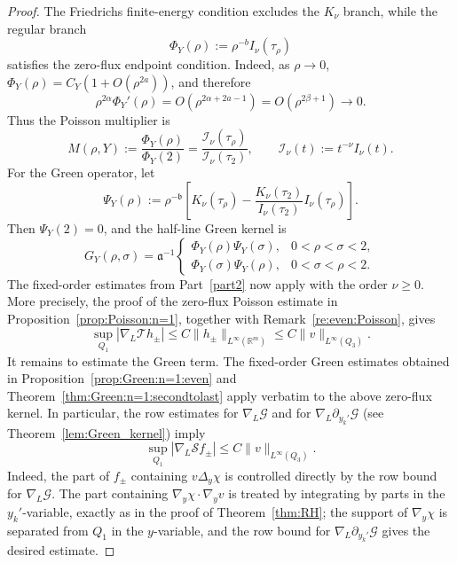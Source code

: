 \documentclass[12pt]{amsart}
\begin{document}
\begin{proof}
The Friedrichs finite-energy condition excludes the $K_\nu$ branch, while the regular branch
\begin{equation*}
    \Phi_Y(\rho):=\rho^{-b}I_\nu(\tau_\rho)
\end{equation*}
satisfies the zero-flux endpoint condition. Indeed, as $\rho\to 0$, $\Phi_Y(\rho)=C_Y\left(1+O(\rho^{2a})\right)$, and therefore
\begin{equation*}
\rho^{2\alpha}\Phi_Y'(\rho) = O\left(\rho^{2\alpha+2a-1}\right) = O\left(\rho^{2\beta+1}\right) \to 0.
\end{equation*}
Thus the Poisson multiplier is
\begin{equation*}
M(\rho,Y) := \frac{\Phi_Y(\rho)}{\Phi_Y(2)} = \frac{\mathcal I_\nu(\tau_\rho)}{\mathcal I_\nu(\tau_2)}, \qquad \mathcal I_\nu(t) := t^{-\nu} I_\nu(t).
\end{equation*}
For the Green operator, let
\begin{equation*}
\Psi_Y(\rho) := \rho^{-\mathfrak b} \left[ K_\nu(\tau_\rho) - \frac{K_\nu(\tau_2)} {I_\nu(\tau_2)} I_\nu(\tau_\rho) \right].
\end{equation*}
Then $\Psi_Y(2)=0$, and the half-line Green kernel is
\begin{equation*}
G_Y(\rho,\sigma) = \mathfrak a^{-1}
\begin{cases}
\Phi_Y(\rho)\Psi_Y(\sigma), & 0<\rho<\sigma<2,\\
\Phi_Y(\sigma)\Psi_Y(\rho), & 0<\sigma<\rho<2.
\end{cases}
\end{equation*}
The fixed-order estimates from Part~\ref{part2} now apply with the order $\nu\ge 0$. More precisely, the proof of the zero-flux Poisson estimate in
Proposition~\ref{prop:Poisson:n=1}, together with
Remark~\ref{re:even:Poisson}, gives
\begin{equation*}
\sup_{Q_1} |\nabla_L \mathcal T h_\pm| \le C\|h_\pm\|_{L^\infty(\mathbb R^m)} \le C\|v\|_{L^\infty(Q_3)}.
\end{equation*}
It remains to estimate the Green term. The fixed-order Green estimates obtained
in Proposition~\ref{prop:Green:n=1:even} and Theorem~\ref{thm:Green:n=1:secondtolast}
apply verbatim to the above zero-flux kernel. In particular, the row estimates
for $\nabla_L \mathcal G$ and for $\nabla_L\partial_{y_k'} \mathcal G$ (see Theorem~\ref{lem:Green_kernel}) imply
\begin{equation*}
\sup_{Q_1}|\nabla_L \mathcal S f_\pm| \le C\|v\|_{L^\infty(Q_3)}.
\end{equation*}
Indeed, the part of $f_\pm$ containing $v\Delta_y\chi$ is controlled directly by the row bound for $\nabla_L \mathcal G$. The part containing $\nabla_y\chi\cdot\nabla_yv$ is treated by integrating by parts in the
$y_k'$-variable, exactly as in the proof of Theorem~\ref{thm:RH};
the support of $\nabla_y\chi$ is separated from $Q_1$ in the $y$-variable, and
the row bound for $\nabla_L\partial_{y_k'} \mathcal G$ gives the desired estimate.


\end{proof}
\end{document}
